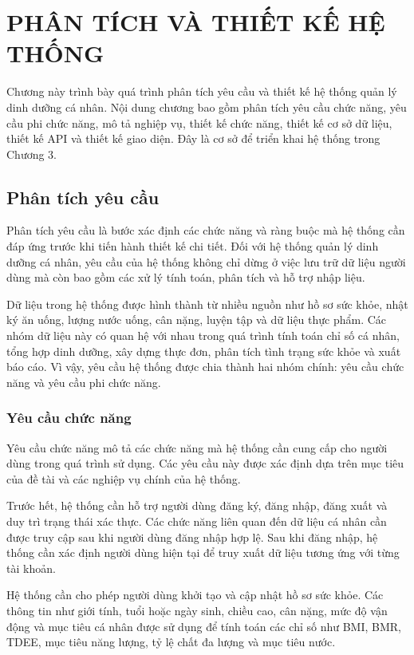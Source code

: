 \documentclass[12pt, a4paper]{report}
\begin{document}
\chapter{PHÂN TÍCH VÀ THIẾT KẾ HỆ THỐNG}
Chương này trình bày quá trình phân tích yêu cầu và thiết kế hệ thống quản lý dinh dưỡng cá nhân. Nội dung chương bao gồm phân tích yêu cầu chức năng, yêu cầu phi chức năng, mô tả nghiệp vụ, thiết kế chức năng, thiết kế cơ sở dữ liệu, thiết kế API và thiết kế giao diện. Đây là cơ sở để triển khai hệ thống trong Chương 3.

\section{Phân tích yêu cầu}Phân tích yêu cầu là bước xác định các chức năng và ràng buộc mà hệ thống cần đáp ứng trước khi tiến hành thiết kế chi tiết. Đối với hệ thống quản lý dinh dưỡng cá nhân, yêu cầu của hệ thống không chỉ dừng ở việc lưu trữ dữ liệu người dùng mà còn bao gồm các xử lý tính toán, phân tích và hỗ trợ nhập liệu.

Dữ liệu trong hệ thống được hình thành từ nhiều nguồn như hồ sơ sức khỏe, nhật ký ăn uống, lượng nước uống, cân nặng, luyện tập và dữ liệu thực phẩm. Các nhóm dữ liệu này có quan hệ với nhau trong quá trình tính toán chỉ số cá nhân, tổng hợp dinh dưỡng, xây dựng thực đơn, phân tích tình trạng sức khỏe và xuất báo cáo. Vì vậy, yêu cầu hệ thống được chia thành hai nhóm chính: yêu cầu chức năng và yêu cầu phi chức năng.

\subsection{Yêu cầu chức năng}Yêu cầu chức năng mô tả các chức năng mà hệ thống cần cung cấp cho người dùng trong quá trình sử dụng. Các yêu cầu này được xác định dựa trên mục tiêu của đề tài và các nghiệp vụ chính của hệ thống.

Trước hết, hệ thống cần hỗ trợ người dùng đăng ký, đăng nhập, đăng xuất và duy trì trạng thái xác thực. Các chức năng liên quan đến dữ liệu cá nhân cần được truy cập sau khi người dùng đăng nhập hợp lệ. Sau khi đăng nhập, hệ thống cần xác định người dùng hiện tại để truy xuất dữ liệu tương ứng với từng tài khoản.

Hệ thống cần cho phép người dùng khởi tạo và cập nhật hồ sơ sức khỏe. Các thông tin như giới tính, tuổi hoặc ngày sinh, chiều cao, cân nặng, mức độ vận động và mục tiêu cá nhân được sử dụng để tính toán các chỉ số như BMI, BMR, TDEE, mục tiêu năng lượng, tỷ lệ chất đa lượng và mục tiêu nước.
\end{document}
